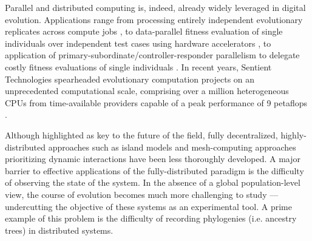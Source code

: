 

Parallel and distributed computing is, indeed, already widely leveraged in digital evolution.
Applications range from processing entirely independent evolutionary replicates across compute jobs \citep{dolson2017spatial, hornby2006automated}, to data-parallel fitness evaluation of single individuals over independent test cases using hardware accelerators \citep{harding2007fast_springer, langdon2019continuous}, to application of primary-subordinate/controller-responder parallelism to delegate costly fitness evaluations of single individuals \citep{cantu2001master,miikkulainen2019evolving}.
In recent years, Sentient Technologies spearheaded evolutionary computation projects on an unprecedented computational scale, comprising over a million heterogeneous CPUs from time-available providers capable of a peak performance of 9 petaflops \citep{miikkulainen2019evolving,gilbert2015artificial,blondeau2009distributed}.

Although highlighted as key to the future of the field, fully decentralized, highly-distributed approaches such as island models \citep{bennett1999building,schulte2010genetic} and mesh-computing approaches prioritizing dynamic interactions \citep{ray1995proposal,ackley2018digital,moreno2021conduit} have been less thoroughly developed.
A major barrier to effective applications of the fully-distributed paradigm is the difficulty of observing the state of the system. 
In the absence of a global population-level view, the course of evolution becomes much more challenging to study --- undercutting the objective of these systems as an experimental tool.
A prime example of this problem is the difficulty of recording phylogenies (i.e. ancestry trees) in distributed systems.

